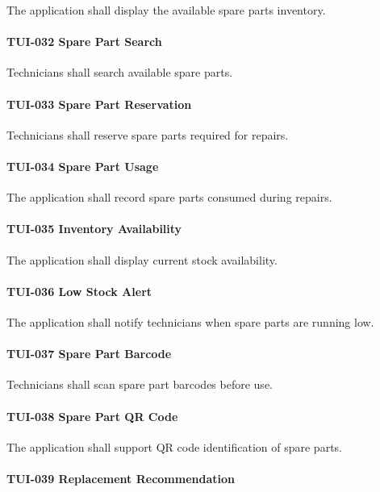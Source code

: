 The application shall display the available spare parts inventory.

\paragraph{TUI-032 Spare Part Search}

Technicians shall search available spare parts.

\paragraph{TUI-033 Spare Part Reservation}

Technicians shall reserve spare parts required for repairs.

\paragraph{TUI-034 Spare Part Usage}

The application shall record spare parts consumed during repairs.

\paragraph{TUI-035 Inventory Availability}

The application shall display current stock availability.

\paragraph{TUI-036 Low Stock Alert}

The application shall notify technicians when spare parts are running
low.

\paragraph{TUI-037 Spare Part Barcode}

Technicians shall scan spare part barcodes before use.

\paragraph{TUI-038 Spare Part QR Code}

The application shall support QR code identification of spare parts.

\paragraph{TUI-039 Replacement Recommendation}


